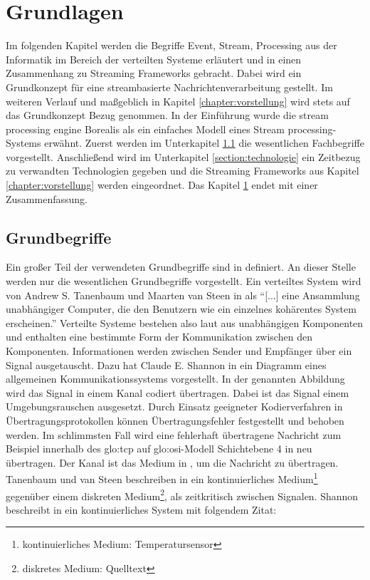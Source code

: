 \chapter{Grundlagen}
\label{chapter:grundlagen}

Im folgenden Kapitel werden die Begriffe Event, Stream, Processing aus der Informatik im Bereich der verteilten Systeme erläutert und in einen Zusammenhang zu Streaming Frameworks gebracht. Dabei wird ein Grundkonzept für eine streambasierte Nachrichtenverarbeitung gestellt. Im weiteren Verlauf und maßgeblich in Kapitel \ref{chapter:vorstellung} wird stets auf das Grundkonzept Bezug genommen. In der Einführung wurde die stream processing engine Borealis  als ein einfaches Modell eines Stream processing-Systems erwähnt. Zuerst werden im Unterkapitel \ref{section:grundbegriffe} die wesentlichen Fachbegriffe vorgestellt. Anschließend wird im Unterkapitel \ref{section:technologie} ein Zeitbezug zu verwandten Technologien gegeben und die Streaming Frameworks aus Kapitel \ref{chapter:vorstellung} werden eingeordnet. Das Kapitel \ref{chapter:grundlagen} endet mit einer Zusammenfassung.

\section{Grundbegriffe}
\label{section:grundbegriffe}

Ein großer Teil der verwendeten Grundbegriffe sind in  definiert. An dieser Stelle werden nur die wesentlichen Grundbegriffe vorgestellt.
Ein verteiltes System wird von Andrew S. Tanenbaum und Maarten van Steen in  als \enquote{[...] eine Ansammlung unabhängiger Computer, die den Benutzern wie ein einzelnes kohärentes System erscheinen.} Verteilte Systeme bestehen also laut  aus unabhängigen Komponenten und enthalten eine bestimmte Form der Kommunikation zwischen den Komponenten. Informationen werden zwischen Sender und Empfänger über ein Signal ausgetauscht. Dazu hat Claude E. Shannon in  ein Diagramm eines allgemeinen Kommunikationssystems vorgestellt. In der genannten Abbildung wird das Signal in einem Kanal codiert übertragen. Dabei ist das Signal einem Umgebungsrauschen ausgesetzt. Durch Einsatz geeigneter Kodierverfahren in Übertragungsprotokollen können Übertragungsfehler festgestellt und behoben werden. Im schlimmsten Fall wird eine fehlerhaft übertragene Nachricht zum Beispiel innerhalb des \gls{glo:tcp} auf \gls{glo:osi}-Modell Schichtebene 4 in  neu übertragen. Der Kanal ist das Medium in , um die Nachricht zu übertragen. %
Tanenbaum und van Steen beschreiben in  ein kontinuierliches Medium\footnote{kontinuierliches Medium: Temperatursensor} gegenüber einem diskreten Medium\footnote{diskretes Medium: Quelltext}, als zeitkritisch zwischen Signalen. %
Shannon beschreibt in  ein kontinuierliches System mit folgendem Zitat:

